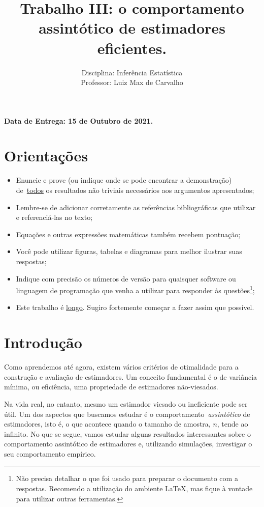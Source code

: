 \documentclass[a4paper,10pt, notitlepage]{report}
\title{Trabalho III: o comportamento assintótico de estimadores eficientes.}
\author{Disciplina: Inferência Estatística \\ Professor: Luiz Max de Carvalho}
\begin{document}
\maketitle

\textbf{Data de Entrega: 15 de Outubro de 2021.}

\section*{Orientações}
\begin{itemize}
 \item Enuncie e prove (ou indique onde se pode encontrar a demonstração) de~\underline{todos} os resultados não triviais necessários aos argumentos apresentados;
 \item Lembre-se de adicionar corretamente as referências bibliográficas que utilizar e referenciá-las no texto;
 \item Equações e outras expressões matemáticas também recebem pontuação;
 \item Você pode utilizar figuras, tabelas e diagramas para melhor ilustrar suas respostas;
 \item Indique com precisão os números de versão para quaisquer software ou linguagem de programação que venha a utilizar para responder às questões\footnote{Não precisa detalhar o que foi usado para preparar o documento com a respostas. Recomendo a utilização do ambiente LaTeX, mas fique à vontade para utilizar outras ferramentas.};
 \item Este trabalho é \underline{longo}.
 Sugiro fortemente começar a fazer assim que possível.
 \end{itemize}


\section*{Introdução}

Como aprendemos até agora, existem vários critérios de otimalidade para a construção e avaliação de estimadores.
Um conceito fundamental é o de variância mínima, ou eficiência, uma propriedade de estimadores não-viesados.

Na vida real, no entanto, mesmo um estimador viesado ou ineficiente pode ser útil.
Um dos aspectos que buscamos estudar é o comportamento~\textit{assintótico} de estimadores, isto é, o que acontece quando o tamanho de amostra, $n$, tende ao infinito.
No que se segue, vamos estudar alguns resultados interessantes sobre o comportamento assintótico de estimadores e, utilizando simulações, investigar o seu comportamento empírico.
\end{document}
